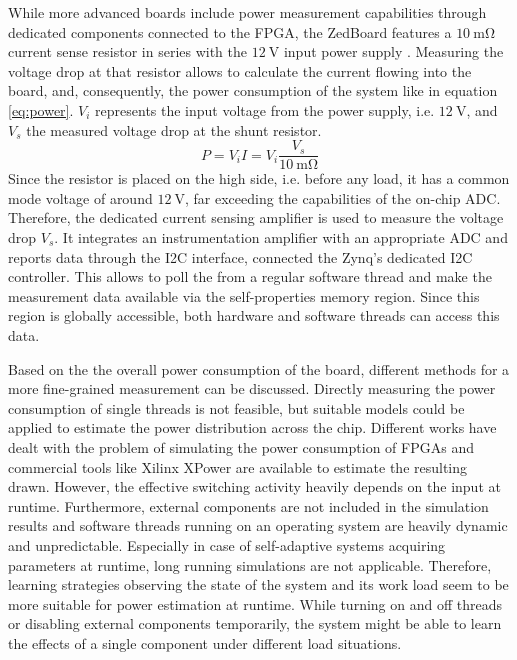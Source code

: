 While more advanced boards include power measurement capabilities through
dedicated components connected to the FPGA, the ZedBoard features a
$\SI{10}{\milli\ohm}$ current sense resistor in series with the
$\SI{12}{\volt}$ input power supply \citep{ZedBoard}. Measuring the voltage
drop at that resistor allows to calculate the current flowing into the board,
and, consequently, the power consumption of the system like in equation
\ref{eq:power}. $V_i$ represents the input voltage from the power supply, i.e.
$\SI{12}{\volt}$, and $V_s$ the measured voltage drop at the shunt resistor.
\begin{equation}
P = V_i I = V_i \frac{V_s}{\SI{10}{\milli\ohm}}
\label{eq:power}
\end{equation}
Since the resistor is placed on the high side, i.e. before any load, it has a
common mode voltage of around $\SI{12}{\volt}$, far exceeding the capabilities
of the on-chip \ac{ADC}. Therefore, the dedicated current sensing amplifier
 is used to measure the voltage drop $V_s$. It integrates an
instrumentation amplifier with an appropriate \ac{ADC} and reports data
through the \ac{I2C} interface, connected the Zynq's dedicated \ac{I2C}
controller. This allows to poll the  from a regular software
thread and make the measurement data available via the self-properties memory
region. Since this region is globally accessible, both hardware and software
threads can access this data.

Based on the the overall power consumption of the board, different methods for
a more fine-grained measurement can be discussed. Directly measuring the power
consumption of single threads is not feasible, but suitable models could be
applied to estimate the power distribution across the chip. Different works
have dealt with the problem of simulating the power consumption of \acp{FPGA}
\citep{DeTu05,JeCa11} and commercial tools like Xilinx XPower are available to
estimate the resulting drawn. However, the effective switching activity
heavily depends on the input at runtime. Furthermore, external components are
not included in the simulation results and software threads running on an
operating system are heavily dynamic and unpredictable. Especially in case of
self-adaptive systems acquiring parameters at runtime, long running
simulations are not applicable. Therefore, learning strategies observing the
state of the system and its work load seem to be more suitable for power
estimation at runtime. While turning on and off threads or disabling external
components temporarily, the system might be able to learn the effects of a
single component under different load situations.

